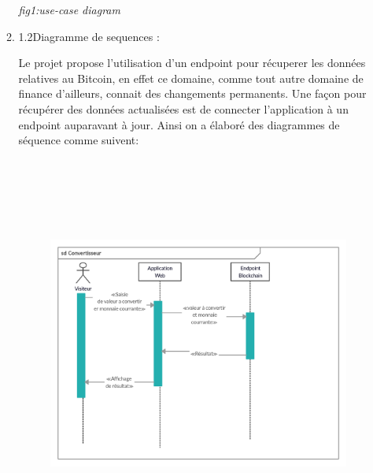 \documentclass[12pt]{article}
\begin{document}
\begin{enumerate}
\begin{enumerate}
\par

\textit{fig1:\tab use-case diagram}\par


\vspace{\baselineskip}

\vspace{\baselineskip}

\vspace{\baselineskip}

\vspace{\baselineskip}

\vspace{\baselineskip}

\vspace{\baselineskip}
	\item 1.2\tab Diagramme de sequences :\par

Le projet propose l’utilisation d’un endpoint pour récuperer les données relatives au Bitcoin, en effet ce domaine, comme tout autre domaine de finance d’ailleurs, connait des changements permanents. Une façon pour récupérer des données actualisées est de connecter l’application à un endpoint auparavant à jour. Ainsi on a élaboré des diagrammes de séquence comme suivent:\par




\begin{figure}[H]
	\begin{Center}
		\includegraphics[width=6.69in,height=5.13in]{./media/image3.png}
	\end{Center}
\end{figure}




\end{enumerate}
\end{enumerate}
\end{document}
